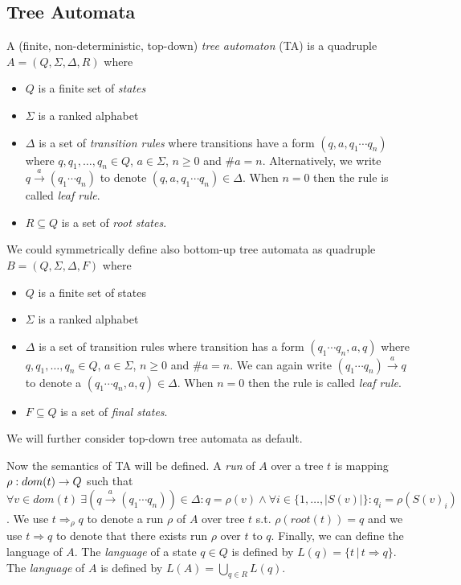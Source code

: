 \subsection{Tree Automata}
\label{subsec:ta}

A (finite, non-deterministic, top-down) \emph{tree automaton} (TA) is a
quadruple $A = (Q, \Sigma, \Delta, R)$ where
\begin{itemize}
	\item $Q$ is a finite set of \emph{states}
	\item $\Sigma$ is a ranked alphabet
	\item $\Delta$ is a set of \emph{transition rules} where transitions have a form $(q,a,q_1 \cdots q_n)$ where $q,q_1,\ldots,q_n \in Q$, $a \in \Sigma$, $n \geq 0$ and $\#a = n$.
		Alternatively, we write $q \xrightarrow{a} (q_1 \cdots q_n)$ to denote $(q,a,q_1 \cdots q_n) \in \Delta$.
		When $n=0$ then the rule is called \emph{leaf rule}.
	\item $R \subseteq Q$ is a set of \emph{root states}.
\end{itemize}

We could symmetrically define also bottom-up tree automata as quadruple $B = (Q, \Sigma, \Delta, F)$ where
\begin{itemize}
	\item $Q$ is a finite set of states
	\item $\Sigma$ is a ranked alphabet
	\item $\Delta$ is a set of transition rules where transition has a form $(q_1 \cdots q_n,a,q)$ where $q,q_1,\ldots,q_n \in Q$, $a \in \Sigma$, $n \geq 0$ and $\#a = n$.
		We can again write $(q_1 \cdots q_n) \xrightarrow{a} q$ to denote a $(q_1 \cdots q_n,a,q) \in \Delta$.
		When $n=0$ then the rule is called \emph{leaf rule}.
	\item $F \subseteq Q$ is a set of \emph{final states}.
\end{itemize}

We will further consider top-down tree automata as default.

Now the semantics of TA will be defined.
A \emph{run} of $A$ over a tree $t$ is mapping $\rho: dom(t) \rightarrow Q$ such that
$\forall v \in dom(t)\ \exists (q \xrightarrow{a} (q_1 \cdots q_n)) \in \Delta:  q=\rho(v) \wedge  \forall i \in \{1, \ldots, |S(v)|\}: q_i=\rho(S(v)_i)$.
We use $t \Rightarrow_{\rho} q$ to denote a run $\rho$ of $A$ over tree $t$ s.t. $\rho(root(t)) = q$ and we use $t \Rightarrow q$ to denote that there exists
run $\rho$ over $t$ to $q$.
Finally, we can define the language of $A$.
The \emph{language} of a state $q\in Q$ is defined by $L(q) = \{t\,|\, t \Rightarrow q\}$.
The \emph{language} of $A$ is defined by $L(A) = \bigcup_{q\in R} L(q)$.

